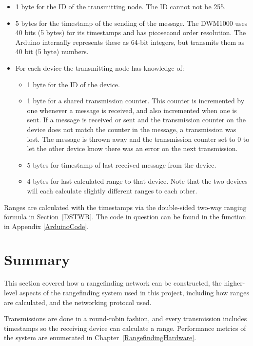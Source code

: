 \begin{itemize}
	\item 1 byte for the ID of the transmitting node. The ID cannot not be 255.
	\item 5 bytes for the timestamp of the sending of the message. The DWM1000 uses 40 bits (5 bytes) for its timestamps and has picosecond order resolution. The Arduino internally represents these as 64-bit integers, but transmits them as 40 bit (5 byte) numbers.
	\item For each device the transmitting node has knowledge of:
	\begin{itemize}
		\item 1 byte for the ID of the device.
		\item 1 byte for a shared transmission counter. This counter is incremented by one whenever a message is received, and also incremented when one is sent. If a message is received or sent and the transmission counter on the device does not match the counter in the message, a transmission was lost. The message is thrown away and the transmission counter set to 0 to let the other device know there was an error on the next transmission.
		\item 5 bytes for timestamp of last received message from the device.
		\item 4 bytes for last calculated range to that device. Note that the two devices will each calculate slightly different ranges to each other.
	\end{itemize} 
\end{itemize}

Ranges are calculated with the timestamps via the double-sided two-way ranging formula in Section~\ref{DSTWR}. The code in question can be found in the  function in Appendix \ref{ArduinoCode}.

\section{Summary}
This section covered how a rangefinding network can be constructed, the higher-level aspects of the rangefinding system used in this project, including how ranges are calculated, and the networking protocol used.

Transmissions are done in a round-robin fashion, and every transmission includes timestamps so the receiving device can calculate a range. Performance metrics of the system are enumerated in Chapter~\ref{RangefindingHardware}.
